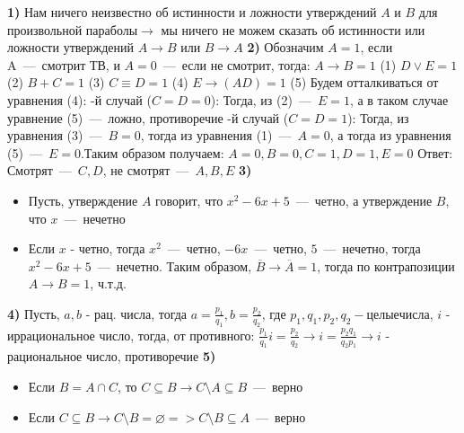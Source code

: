 \documentclass[12pt,a4paper,fleqn]{article}
\begin{document}
{\bf 1)} Нам ничего неизвестно об истинности и ложности утверждений $A$ и $B$ для произвольной параболы$\rightarrow$ мы ничего не можем сказать об истинности или ложности утверждений $A \rightarrow B$ или $B \rightarrow A$ \newline
{\bf 2)} Обозначим $A = 1$, если A~---~смотрит ТВ, и $A = 0$~---~если не смотрит, тогда: \newline
$A \rightarrow B = 1$ (1) \newline
$D \lor E = 1$ (2) \newline
$B + C = 1$ (3) \newline
$C \equiv D = 1$ (4) \newline
$E \rightarrow (AD) = 1$ (5) \newline
Будем отталкиваться от уравнения (4): -й случай ($C = D = 0$):\newline
Тогда, из (2)~---~$E = 1$, а в таком случае уравнение (5)~---~ложно, противоречие  -й случай ($C = D = 1$): \newline
Тогда, из уравнения (3)~---~$B = 0$, тогда из уравнения (1)~---~$A = 0$, а тогда из уравнения (5)~---~$E = 0$.Таким образом получаем: $A = 0, B = 0, C = 1, D = 1, E = 0$ \newline
Ответ: Смотрят~---~$C, D$, не смотрят~---~$A, B, E$ \newline
{\bf 3)}
\begin{itemize}
\item Пусть, утверждение $A$ говорит, что $x^2 -6x + 5$~---~четно, а утверждение $B$, что $x$~---~нечетно \newline
\item Если $x$ - четно, тогда $x^2$~---~четно, $-6x$~---~четно, $5$~---~нечетно, тогда $x^2 -6x + 5$~---~нечетно. Таким образом, $\overline{B} \rightarrow \overline{A} = 1$, тогда по контрапозиции $A \rightarrow B = 1$, ч.т.д.\newline
\end{itemize}
{\bf 4)} Пусть, $a, b$ - рац. числа, тогда $a = \frac{p_1}{q_1}, b = \frac{p_2}{q_2}$, где  $p_1,q_1,p_2,q_2 - целые числа$, $i$ - иррациональное число, тогда, от противного: \newline 
$\frac{p_1}{q_1} i = \frac{p_2}{q_2} \rightarrow i = \frac{p_2q_1}{q_2p_1} \rightarrow i$ - рациональное число, противоречие \newline
{\bf 5)}
\begin{itemize} 
\item Если $B = A \cap C$, то $C \subseteq B \rightarrow C \setminus A \subseteq B$~---~верно \newline
\item Если $C \subseteq B \rightarrow C \setminus B = \varnothing => C \setminus B \subseteq A$~---~верно \newline 
\end{itemize}
\end{document}
